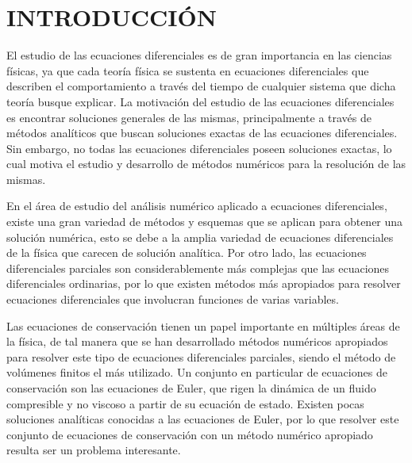 \chapter{INTRODUCCIÓN}
El estudio de las ecuaciones diferenciales es de gran importancia en las ciencias físicas, ya que cada teoría física se sustenta en ecuaciones diferenciales que describen el comportamiento a través del tiempo de cualquier sistema que dicha teoría busque explicar. La motivación del estudio de las ecuaciones diferenciales es encontrar soluciones generales de las mismas, principalmente a través de métodos analíticos que buscan soluciones exactas de las ecuaciones diferenciales. Sin embargo, no todas las ecuaciones diferenciales poseen soluciones exactas, lo cual motiva el estudio y desarrollo de métodos numéricos para la resolución de las mismas.

En el área de estudio del análisis numérico aplicado a ecuaciones diferenciales, existe una gran variedad de métodos y esquemas que se aplican para obtener una solución numérica, esto se debe a la amplia variedad de ecuaciones diferenciales de la física que carecen de solución analítica. Por otro lado, las ecuaciones diferenciales parciales son considerablemente más complejas que las ecuaciones diferenciales ordinarias, por lo que existen métodos más apropiados para resolver ecuaciones diferenciales que involucran funciones de varias variables.

Las ecuaciones de conservación tienen un papel importante en múltiples áreas de la física, de tal manera que se han desarrollado métodos numéricos apropiados para resolver este tipo de ecuaciones diferenciales parciales, siendo el método de volúmenes finitos el más utilizado. Un conjunto en particular de ecuaciones de conservación son las ecuaciones de Euler, que rigen la dinámica de un fluido compresible y no viscoso a partir de su ecuación de estado. Existen pocas soluciones analíticas conocidas a las ecuaciones de Euler, por lo que resolver este conjunto de ecuaciones de conservación con un método numérico apropiado resulta ser un problema interesante.